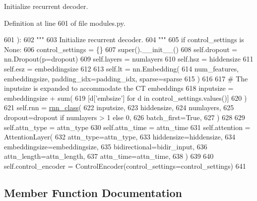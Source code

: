 \begin{DoxyVerb}Initialize recurrent decoder.
\end{DoxyVerb}
 

Definition at line 601 of file modules.\+py.


\begin{DoxyCode}
601     ):
602         \textcolor{stringliteral}{"""}
603 \textcolor{stringliteral}{        Initialize recurrent decoder.}
604 \textcolor{stringliteral}{        """}
605         \textcolor{keywordflow}{if} control\_settings \textcolor{keywordflow}{is} \textcolor{keywordtype}{None}:
606             control\_settings = \{\}
607         super().\_\_init\_\_()
608         self.dropout = nn.Dropout(p=dropout)
609         self.layers = numlayers
610         self.hsz = hiddensize
611         self.esz = embeddingsize
612 
613         self.lt = nn.Embedding(
614             num\_features, embeddingsize, padding\_idx=padding\_idx, sparse=sparse
615         )
616 
617         \textcolor{comment}{# The inputsize is expanded to accommodate the CT embeddings}
618         inputsize = embeddingsize + sum(
619             [d[\textcolor{stringliteral}{'embsize'}] \textcolor{keywordflow}{for} d \textcolor{keywordflow}{in} control\_settings.values()]
620         )
621         self.rnn = \hyperlink{namespaceseq2seq_1_1train_a46177da1cc74c4a2874e4a527d857f75}{rnn\_class}(
622             inputsize,
623             hiddensize,
624             numlayers,
625             dropout=dropout \textcolor{keywordflow}{if} numlayers > 1 \textcolor{keywordflow}{else} 0,
626             batch\_first=\textcolor{keyword}{True},
627         )
628 
629         self.attn\_type = attn\_type
630         self.attn\_time = attn\_time
631         self.attention = AttentionLayer(
632             attn\_type=attn\_type,
633             hiddensize=hiddensize,
634             embeddingsize=embeddingsize,
635             bidirectional=bidir\_input,
636             attn\_length=attn\_length,
637             attn\_time=attn\_time,
638         )
639 
640         self.control\_encoder = ControlEncoder(control\_settings=control\_settings)
641 
\end{DoxyCode}


\subsection{Member Function Documentation}
\mbox{\label{classprojects_1_1controllable__dialogue_1_1controllable__seq2seq_1_1modules_1_1RNNDecoder_acfba6f98c3a1b7a9bd95981a8b5b79a5}} 
